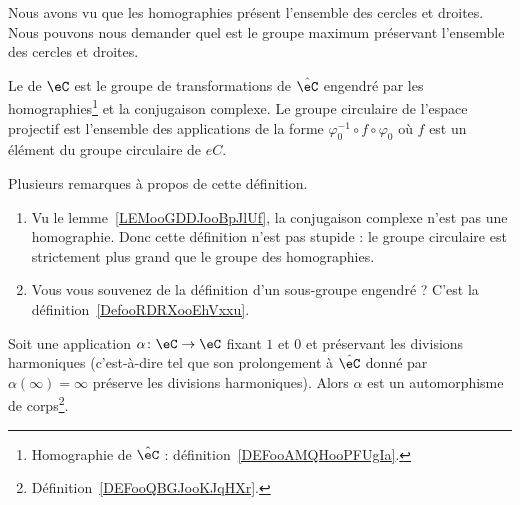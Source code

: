 Nous avons vu que les homographies présent l'ensemble des cercles et droites. Nous pouvons nous demander quel est le groupe maximum préservant l'ensemble des cercles et droites.

\begin{definition}
    Le  de \( \eC\) est le groupe de transformations de \( \hat \eC  \) engendré par les homographies\footnote{Homographie de \( \hat\eC\) : définition~\ref{DEFooAMQHooPFUgIa}.} et la conjugaison complexe. Le groupe circulaire de l'espace projectif est l'ensemble des applications de la forme \( \varphi_0^{-1}\circ f\circ\varphi_0\) où \( f\) est un élément du groupe circulaire de \( eC\).
\end{definition}

Plusieurs remarques à propos de cette définition.
\begin{enumerate}
    \item
        Vu le lemme~\ref{LEMooGDDJooBpJlUf}, la conjugaison complexe n'est pas une homographie. Donc cette définition n'est pas stupide : le groupe circulaire est strictement plus grand que le groupe des homographies.
    \item
        Vous vous souvenez de la définition d'un sous-groupe engendré ? C'est la définition~\ref{DefooRDRXooEhVxxu}.
\end{enumerate}

\begin{lemma}       \label{LEMooOPOMooWZLSeH}
    Soit une application \( \alpha\colon \eC\to \eC\) fixant \( 1\) et \( 0\) et préservant les divisions harmoniques (c'est-à-dire tel que son prolongement à \( \hat\eC\) donné par \( \alpha(\infty)=\infty\) préserve les divisions harmoniques). Alors \( \alpha\) est un automorphisme de corps\footnote{Définition~\ref{DEFooQBGJooKJqHXr}.}.
\end{lemma}

